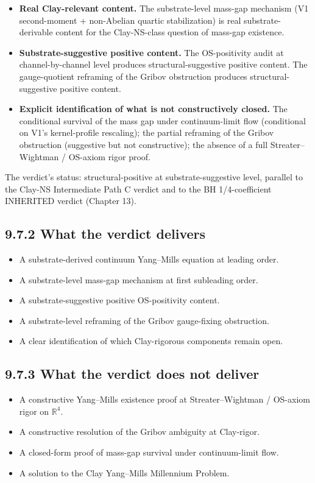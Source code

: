 \documentclass[11pt]{book}
\begin{document}
\begin{itemize}
\item \textbf{Real Clay-relevant content.} The substrate-level mass-gap mechanism (V1 second-moment + non-Abelian quartic stabilization) is real substrate-derivable content for the Clay-NS-class question of mass-gap existence.
\item \textbf{Substrate-suggestive positive content.} The OS-positivity audit at channel-by-channel level produces structural-suggestive positive content. The gauge-quotient reframing of the Gribov obstruction produces structural-suggestive positive content.
\item \textbf{Explicit identification of what is not constructively closed.} The conditional survival of the mass gap under continuum-limit flow (conditional on V1's kernel-profile rescaling); the partial reframing of the Gribov obstruction (suggestive but not constructive); the absence of a full Streater–Wightman / OS-axiom rigor proof.
\end{itemize}

The verdict's status: structural-positive at substrate-suggestive level, parallel to the Clay-NS Intermediate Path C verdict and to the BH 1/4-coefficient INHERITED verdict (Chapter 13).

\subsection{9.7.2 What the verdict delivers}

\begin{itemize}
\item A substrate-derived continuum Yang–Mills equation at leading order.
\item A substrate-level mass-gap mechanism at first subleading order.
\item A substrate-suggestive positive OS-positivity content.
\item A substrate-level reframing of the Gribov gauge-fixing obstruction.
\item A clear identification of which Clay-rigorous components remain open.
\end{itemize}

\subsection{9.7.3 What the verdict does not deliver}

\begin{itemize}
\item A constructive Yang–Mills existence proof at Streater–Wightman / OS-axiom rigor on $\mathbb{R}^4$.
\item A constructive resolution of the Gribov ambiguity at Clay-rigor.
\item A closed-form proof of mass-gap survival under continuum-limit flow.
\item A solution to the Clay Yang–Mills Millennium Problem.
\end{itemize}
\end{document}
